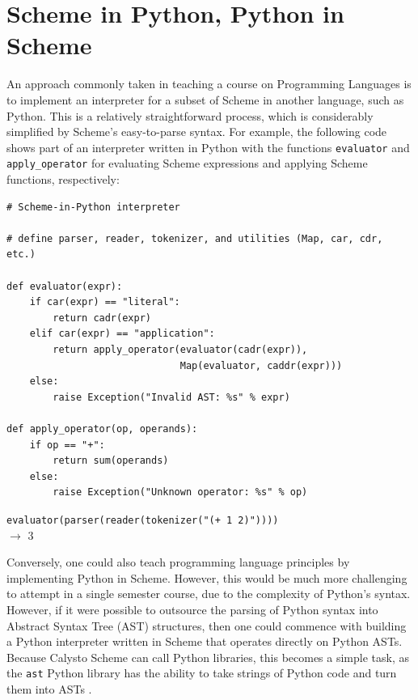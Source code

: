 \documentclass[acmsmall,screen,authorversion]{acmart}
\begin{document}

\section{Scheme in Python, Python in Scheme}

An approach commonly taken in teaching a course on Programming Languages
is to implement an interpreter for a subset of Scheme in another language, such
as Python. This is a relatively straightforward process, which is considerably
simplified by Scheme's easy-to-parse syntax.  For example, the following code
shows part of an interpreter written in Python with the functions
\texttt{evaluator} and \texttt{apply\_operator} for evaluating Scheme
expressions and applying Scheme functions, respectively:\\

\begin{minipage}{\textwidth}
{\small
\begin{verbatim}
# Scheme-in-Python interpreter

# define parser, reader, tokenizer, and utilities (Map, car, cdr, etc.)

def evaluator(expr):
    if car(expr) == "literal":
        return cadr(expr)
    elif car(expr) == "application":
        return apply_operator(evaluator(cadr(expr)),
                              Map(evaluator, caddr(expr)))
    else:
        raise Exception("Invalid AST: %s" % expr)

def apply_operator(op, operands):
    if op == "+":
        return sum(operands)
    else:
        raise Exception("Unknown operator: %s" % op)

\end{verbatim}
\texttt{evaluator(parser(reader(tokenizer("(+ 1 2)"))))}\\
$\rightarrow$ 3\\
}
\end{minipage}

\noindent
Conversely, one could also teach programming language principles by
implementing Python in Scheme. However, this would be much more challenging to
attempt in a single semester course, due to the complexity of Python's
syntax. However, if it were possible to outsource the parsing of Python syntax
into Abstract Syntax Tree (AST) structures, then one could commence with
building a Python interpreter written in Scheme that operates directly on
Python ASTs. Because Calysto Scheme can call Python libraries, this becomes a
simple task, as the \texttt{ast} Python library has the ability to take strings
of Python code and turn them into ASTs \cite{PythonInScheme}.
\end{document}
